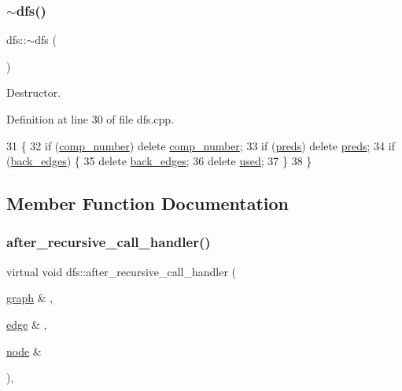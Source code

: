 \subsubsection{\texorpdfstring{$\sim$dfs()}{~dfs()}}
{\footnotesize\ttfamily dfs\+::$\sim$dfs (\begin{DoxyParamCaption}{ }\end{DoxyParamCaption})\hspace{0.3cm}{\ttfamily [virtual]}}



Destructor. 



Definition at line 30 of file dfs.\+cpp.


\begin{DoxyCode}
31 \{
32     \textcolor{keywordflow}{if} (\mbox{\hyperlink{classdfs_a00db016ac7eab69045cae408008890c1}{comp\_number}}) \textcolor{keyword}{delete} \mbox{\hyperlink{classdfs_a00db016ac7eab69045cae408008890c1}{comp\_number}};
33     \textcolor{keywordflow}{if} (\mbox{\hyperlink{classdfs_a3fdeb5a211a1bc1753b2a637258c5355}{preds}}) \textcolor{keyword}{delete} \mbox{\hyperlink{classdfs_a3fdeb5a211a1bc1753b2a637258c5355}{preds}};
34     \textcolor{keywordflow}{if} (\mbox{\hyperlink{classdfs_a1dc18a7df8d6b238d5301c92fc7540fa}{back\_edges}}) \{
35     \textcolor{keyword}{delete} \mbox{\hyperlink{classdfs_a1dc18a7df8d6b238d5301c92fc7540fa}{back\_edges}};
36     \textcolor{keyword}{delete} \mbox{\hyperlink{classdfs_afc18288747491be301d6d8d85d8f220b}{used}};
37     \} 
38 \}
\end{DoxyCode}


\subsection{Member Function Documentation}
\mbox{\label{classdfs_a92fdca8a77b55d08b129aeab4fc66e4c}} 
\subsubsection{\texorpdfstring{after\+\_\+recursive\+\_\+call\+\_\+handler()}{after\_recursive\_call\_handler()}}
{\footnotesize\ttfamily virtual void dfs\+::after\+\_\+recursive\+\_\+call\+\_\+handler (\begin{DoxyParamCaption}\item[{\mbox{\hyperlink{classgraph}{graph}} \&}]{,  }\item[{\mbox{\hyperlink{classedge}{edge}} \&}]{,  }\item[{\mbox{\hyperlink{classnode}{node}} \&}]{ }\end{DoxyParamCaption})\hspace{0.3cm}{\ttfamily [inline]}, {\ttfamily [virtual]}}



